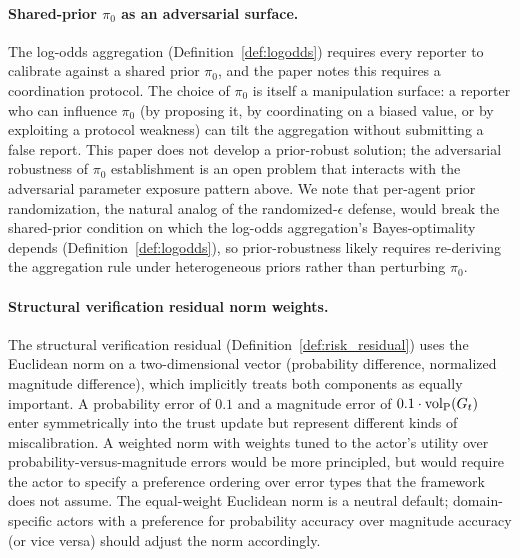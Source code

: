 \paragraph{Shared-prior $\pi_0$ as an adversarial surface.}
The log-odds aggregation (Definition~\ref{def:logodds}) requires
every reporter to calibrate against a shared prior $\pi_0$, and
the paper notes this requires a coordination protocol. The choice
of $\pi_0$ is itself a manipulation surface: a reporter who can
influence $\pi_0$ (by proposing it, by coordinating on a biased
value, or by exploiting a protocol weakness) can tilt the
aggregation without submitting a false report. This paper does not
develop a prior-robust solution; the adversarial robustness of
$\pi_0$ establishment is an open problem that interacts with the
adversarial parameter exposure pattern above. We note that
per-agent prior randomization, the natural analog of the
randomized-$\epsilon$ defense, would break the shared-prior
condition on which the log-odds aggregation's Bayes-optimality
depends (Definition~\ref{def:logodds}), so prior-robustness likely
requires re-deriving the aggregation rule under heterogeneous priors
rather than perturbing $\pi_0$.

\paragraph{Structural verification residual norm weights.}
The structural verification residual
(Definition~\ref{def:risk_residual}) uses the Euclidean norm on a
two-dimensional vector (probability difference, normalized magnitude
difference), which implicitly treats both components as equally
important. A probability error of $0.1$ and a magnitude error of
$0.1 \cdot {\operatorname{vol}_{\mathrm{P}}}(G_t)$ enter symmetrically into the trust update
but represent different kinds of miscalibration. A weighted norm
with weights tuned to the actor's utility over probability-versus-magnitude
errors would be more principled, but would require the actor to
specify a preference ordering over error types that the framework
does not assume. The equal-weight Euclidean norm is a neutral
default; domain-specific actors with a preference for probability
accuracy over magnitude accuracy (or vice versa) should adjust the
norm accordingly.

